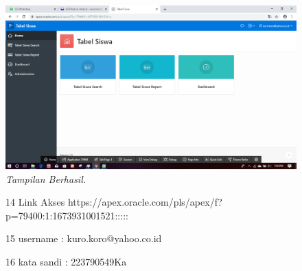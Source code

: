 \begin{enumerate}
\begin{figure}
    \begin{center}
\includegraphics[scale=0.2]{figures/13.png}
    \caption{\textit{Tampilan Berhasil.}}
        \end{center}
\label{gambar}
\end{figure}


\begin{figure}

\item[14] Link Akses  https://apex.oracle.com/pls/apex/f?p=79400:1:1673931001521:::::
\item[15] username   : kuro.koro@yahoo.co.id
\item[16] kata sandi : 223790549Ka
\end{figure}

\end{enumerate}
